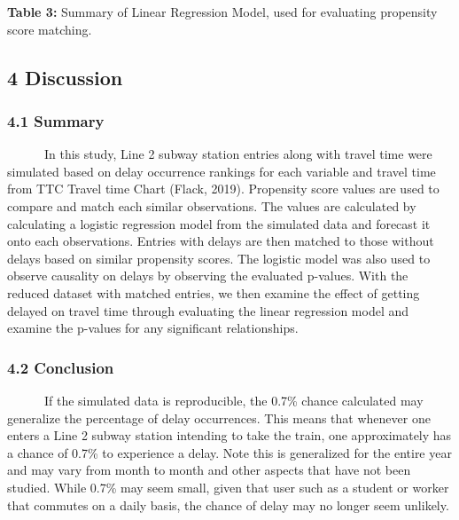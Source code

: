 \documentclass[
]{article}
\begin{document}
\textbf{Table 3:} Summary of Linear Regression Model, used for
evaluating propensity score matching.

\hypertarget{discussion}{%
\subsection{4 Discussion}\label{discussion}}

\hypertarget{summary}{%
\subsubsection{4.1 Summary}\label{summary}}

~~~~~~In this study, Line 2 subway station entries along with travel
time were simulated based on delay occurrence rankings for each variable
and travel time from TTC Travel time Chart (Flack, 2019). Propensity
score values are used to compare and match each similar observations.
The values are calculated by calculating a logistic regression model
from the simulated data and forecast it onto each observations. Entries
with delays are then matched to those without delays based on similar
propensity scores. The logistic model was also used to observe causality
on delays by observing the evaluated p-values. With the reduced dataset
with matched entries, we then examine the effect of getting delayed on
travel time through evaluating the linear regression model and examine
the p-values for any significant relationships.

\hypertarget{conclusion}{%
\subsubsection{4.2 Conclusion}\label{conclusion}}

~~~~~~If the simulated data is reproducible, the 0.7\% chance calculated
may generalize the percentage of delay occurrences. This means that
whenever one enters a Line 2 subway station intending to take the train,
one approximately has a chance of 0.7\% to experience a delay. Note this
is generalized for the entire year and may vary from month to month and
other aspects that have not been studied. While 0.7\% may seem small,
given that user such as a student or worker that commutes on a daily
basis, the chance of delay may no longer seem unlikely.
\end{document}
